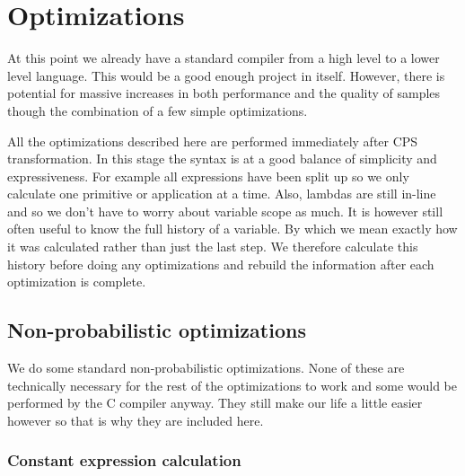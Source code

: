 \documentclass[a4paper]{article}
\begin{document}
\section{Optimizations}

At this point we already have a standard compiler from a high level to a lower level language. This would be a good enough project in itself. However, there is potential for massive increases in both performance and the quality of samples though the combination of a few simple optimizations.

All the optimizations described here are performed immediately after CPS transformation. In this stage the syntax is at a good balance of simplicity and expressiveness. For example all expressions have been split up so we only calculate one primitive or application at a time. Also, lambdas are still in-line and so we don't have to worry about variable scope as much. It is however still often useful to know the full history of a variable. By which we mean exactly how it was calculated rather than just the last step. We therefore calculate this history before doing any optimizations and rebuild the information after each optimization is complete.




\subsection{Non-probabilistic optimizations}

We do some standard non-probabilistic optimizations. None of these are technically necessary for the rest of the optimizations to work and some would be performed by the C compiler anyway. They still make our life a little easier however so that is why they are included here.




\subsubsection{Constant expression calculation}
\end{document}
